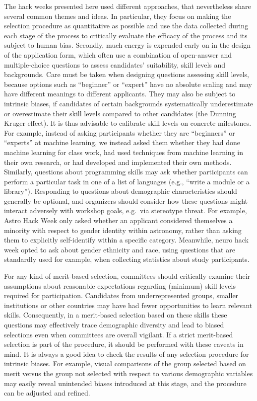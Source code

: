 \documentclass{aastex62}
\begin{document}
The hack weeks presented here used different approaches, that nevertheless share several common themes and ideas. In particular, they focus on making the selection procedure as quantitative as possible and use the data collected during each stage of the process to critically evaluate the efficacy of the process and its subject to human bias.
Secondly, much energy is expended early on in the design of the application form, which often use a combination of open-answer and multiple-choice questions to assess candidates' suitability, skill levels and backgrounds. Care must be taken when designing questions assessing skill levels, because options such as ``beginner'' or ``expert'' have no absolute scaling and may have different meanings to different applicants. They may also be subject to intrinsic biases, if candidates of certain backgrounds systematically underestimate or overestimate their skill levels compared to other candidates (the Dunning Kruger effect). It is thus advisable to calibrate skill levels on concrete milestones. For example, instead of asking participants whether they are ``beginners'' or ``experts'' at machine learning, we instead asked them whether they had done machine learning for class work, had used techniques from machine learning in their own research, or had developed and implemented their own methods. Similarly, questions about programming skills may ask whether participants can perform a particular task in one of a list of languages (e.g., ``write a module or a library'').
Responding to questions about demographic characteristics should generally be optional, and organizers should consider how these questions might interact adversely with workshop goals, e.g.\ via stereotype threat. For example, Astro Hack Week only asked whether an applicant considered themselves a minority with respect to gender identity within astronomy, rather than asking them to explicitly self-identify within a specific category. Meanwhile, neuro hack week opted to ask about gender ethnicity and race, using questions that are standardly used for example, when collecting statistics about study participants.

 For any kind of merit-based selection, committees should critically examine their assumptions about reasonable expectations regarding (minimum) skill levels required for participation. Candidates from underrepresented groups, smaller institutions or other countries may have had fewer opportunities to learn relevant skills. Consequently, in a merit-based selection based on these skills these questions may effectively trace demographic diversity and lead to biased selections even when committees are overall vigilant. If a strict merit-based selection is part of the procedure, it should be performed with these caveats in mind. It is always a good idea to check the results of any selection procedure for intrinsic biases. For example, visual comparisons of the group selected based on merit versus the group not selected with respect to various demographic variables may easily reveal unintended biases introduced at this stage, and the procedure can be adjusted and refined.
 
\end{document}
